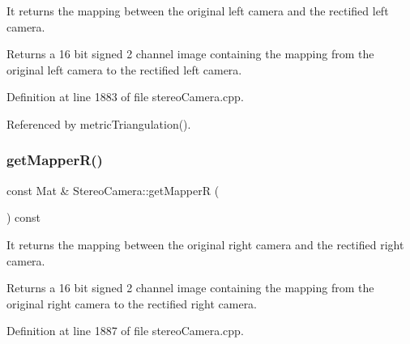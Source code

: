 It returns the mapping between the original left camera and the rectified left camera. 

\begin{DoxyReturn}{Returns}
a 16 bit signed 2 channel image containing the mapping from the original left camera to the rectified left camera. 
\end{DoxyReturn}


Definition at line 1883 of file stereo\+Camera.\+cpp.


\begin{DoxyCode}{0}

\end{DoxyCode}


Referenced by metric\+Triangulation().

\mbox{\label{classStereoCamera_ac3f7763fdb6ed57f96924bb0b32b4ea7}} 
\subsubsection{\texorpdfstring{getMapperR()}{getMapperR()}}
{\footnotesize\ttfamily const Mat \& Stereo\+Camera\+::get\+MapperR (\begin{DoxyParamCaption}{ }\end{DoxyParamCaption}) const}



It returns the mapping between the original right camera and the rectified right camera. 

\begin{DoxyReturn}{Returns}
a 16 bit signed 2 channel image containing the mapping from the original right camera to the rectified right camera. 
\end{DoxyReturn}


Definition at line 1887 of file stereo\+Camera.\+cpp.


\begin{DoxyCode}{0}

\end{DoxyCode}
\mbox{\label{classStereoCamera_aa50cb648f92d099e1ffbb7bab57c3fc3}} 
